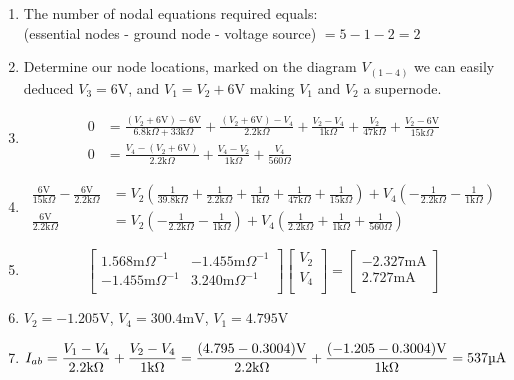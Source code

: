 \documentclass[12pt]{article}
\def\k{\mathrm{k}}
\def\V{\mathrm{V}}
\def\A{\mathrm{A}}
\def\m{\mathrm{m}}
\def\u{\textrm{\textmu}}
\begin{document}
\begin{enumerate}
	\item The number of nodal equations required equals: \\ (essential nodes - ground node - voltage source) $= 5-1-2=2$
	\item Determine our node locations, marked on the diagram $V_{(1-4)}$ we can easily deduced $V_3=6\V$, and $V_1=V_2+6\V$ making $V_1$ and $V_2$ a supernode.
	\item \begin{align*}
		      0 & =\frac{(V_2+6\V)-6\V}{6.8\k\Omega+33\k\Omega}
		      +\frac{(V_2+6\V)-V_4}{2.2\k\Omega}
		      +\frac{V_2-V_4}{1\k\Omega}
		      +\frac{V_2}{47\k\Omega}
		      +\frac{V_2-6\V}{15\k\Omega}                       \\
		      0 & =\frac{V_4-(V_2+6\V)}{2.2\k\Omega}
		      +\frac{V_4-V_2}{1\k\Omega}
		      +\frac{V_4}{560\Omega}
	      \end{align*}
	\item \begin{align*}
		      \frac{6\V}{15\k\Omega}-\frac{6\V}{2.2\k\Omega} & =V_2\left(\frac{1}{39.8\k\Omega}
		      +\frac{1}{2.2\k\Omega}
		      +\frac{1}{1\k\Omega}
		      +\frac{1}{47\k\Omega}
		      +\frac{1}{15\k\Omega}\right)
		      +V_4\left(-\frac{1}{2.2\k\Omega}
		      -\frac{1}{1\k\Omega}\right)
		      \\
		      \frac{6\V}{2.2\k\Omega}                        & =
		      V_2\left(-\frac{1}{2.2\k\Omega}-\frac{1}{1\k\Omega}\right)
		      +V_4\left(\frac{1}{2.2\k\Omega}
		      +\frac{1}{1\k\Omega}
		      +\frac{1}{560\Omega}\right)
	      \end{align*}
	\item \[
		      \begin{bmatrix}
			      1.568\m\Omega^{-1}  & -1.455\m\Omega^{-1} \\
			      -1.455\m\Omega^{-1} & 3.240\m\Omega^{-1}  \\
		      \end{bmatrix}
		      \begin{bmatrix}
			      V_2 \\
			      V_4 \\
		      \end{bmatrix}
		      =
		      \begin{bmatrix}
			      -2.327\m\A \\
			      2.727\m\A  \\
		      \end{bmatrix}
	      \]
	\item $V_2=-1.205\V$, $V_4=300.4\m\V$, $V_1=4.795\V$
	\item $\displaystyle{I_{ab}=\frac{V_1-V_4}{2.2\k\Omega}+\frac{V_2-V_4}{1\k\Omega}=\frac{(4.795-0.3004)\V}{2.2\k\Omega}+\frac{(-1.205-0.3004)\V}{1\k\Omega}}=537\u\A$
\end{enumerate}
\end{document}

